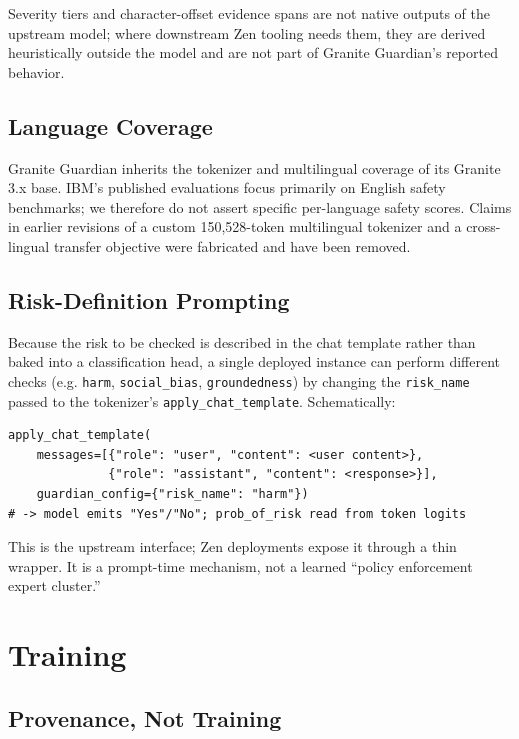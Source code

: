 \documentclass[11pt,a4paper]{article}
\begin{document}
Severity tiers and character-offset evidence spans are not native outputs of the upstream
model; where downstream Zen tooling needs them, they are derived heuristically outside the
model and are not part of Granite Guardian's reported behavior.

\subsection{Language Coverage}

Granite Guardian inherits the tokenizer and multilingual coverage of its Granite 3.x base.
IBM's published evaluations focus primarily on English safety benchmarks; we therefore do
not assert specific per-language safety scores. Claims in earlier revisions of a custom
150{,}528-token multilingual tokenizer and a cross-lingual transfer objective were
fabricated and have been removed.

\subsection{Risk-Definition Prompting}

Because the risk to be checked is described in the chat template rather than baked into a
classification head, a single deployed instance can perform different checks (e.g.
\texttt{harm}, \texttt{social\_bias}, \texttt{groundedness}) by changing the
\texttt{risk\_name} passed to the tokenizer's \texttt{apply\_chat\_template}. Schematically:

\begin{verbatim}
apply_chat_template(
    messages=[{"role": "user", "content": <user content>},
              {"role": "assistant", "content": <response>}],
    guardian_config={"risk_name": "harm"})
# -> model emits "Yes"/"No"; prob_of_risk read from token logits
\end{verbatim}

This is the upstream interface; Zen deployments expose it through a thin wrapper. It is a
prompt-time mechanism, not a learned ``policy enforcement expert cluster.''

\section{Training}
\label{sec:training}

\subsection{Provenance, Not Training}
\end{document}
